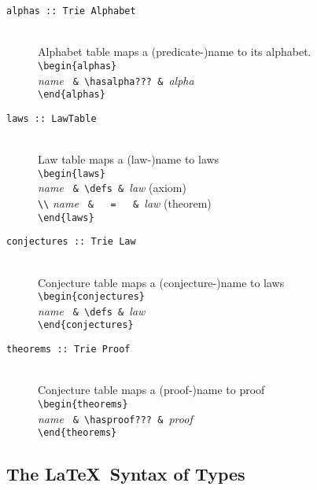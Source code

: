 \begin{description}
  \item[\texttt{alphas :: Trie Alphabet}]~\\
    Alphabet table maps a (predicate-)name to its alphabet.
    \\\verb"\begin{alphas}"
    \\ \phantom{mm}\textit{\textsf{name}} \verb" & \hasalpha??? & "\textit{\textsf{alpha}}
    \\\verb"\end{alphas}"
  \item[\texttt{laws :: LawTable}]~\\
    Law table maps a (law-)name to laws
    \\\verb"\begin{laws}"
    \\ \phantom{mn}\textit{\textsf{name}} \verb" & \defs & "\textit{\textsf{law}}  (axiom)
    \\ \verb"\\"   \textit{\textsf{name}} \verb" &   =   & "\textit{\textsf{law}}  (theorem)
    \\\verb"\end{laws}"
  \item[\texttt{conjectures :: Trie Law}]~\\
    Conjecture table maps a (conjecture-)name to laws
    \\\verb"\begin{conjectures}"
    \\ \phantom{mm}\textit{\textsf{name}} \verb" & \defs & "\textit{\textsf{law}}
    \\\verb"\end{conjectures}"
  \item[\texttt{theorems :: Trie Proof}]~\\
    Conjecture table maps a (proof-)name to proof
    \\\verb"\begin{theorems}"
    \\ \phantom{mm}\textit{\textsf{name}} \verb" & \hasproof??? & "\textit{\textsf{proof}}
    \\\verb"\end{theorems}"
\end{description}

\newpage
\subsection{The \LaTeX\ Syntax of Types}

